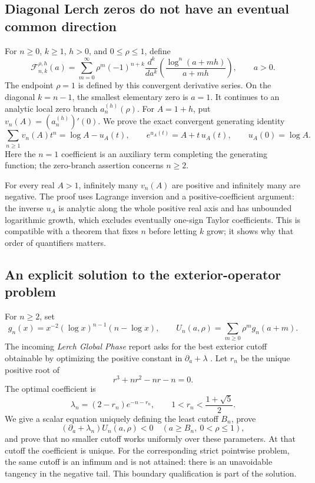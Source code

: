 \documentclass[11pt,a4paper]{article}
\theoremstyle{definition}
\theoremstyle{remark}
\numberwithin{equation}{section}
\begin{document}
\subsection{Diagonal Lerch zeros do not have an eventual common direction}

For $n\ge0$, $k\ge1$, $h>0$, and $0\le\rho\le1$, define
\[
 \mathscr F_{n,k}^{\rho,h}(a)=
 \sum_{m=0}^{\infty}\rho^m(-1)^{n+k}
 \frac{d^k}{da^k}\left(\frac{\log^n(a+mh)}{a+mh}\right),
 \qquad a>0.
\]
The endpoint $\rho=1$ is defined by this convergent derivative series.
On the diagonal $k=n-1$, the smallest elementary zero is $a=1$.
It continues to an analytic local zero branch $a_n^{(h)}(\rho)$.
For $A=1+h$, put $v_n(A)=(a_n^{(h)})'(0)$.
We prove the exact convergent generating identity
\[
 \sum_{n\ge1}v_n(A)t^n=\log A-u_A(t),\qquad
 e^{u_A(t)}=A+t\,u_A(t),\qquad u_A(0)=\log A.
\]
Here the $n=1$ coefficient is an auxiliary term completing the generating
function; the zero-branch assertion concerns $n\ge2$.

For every real $A>1$, infinitely many $v_n(A)$ are positive and infinitely
many are negative. The proof uses Lagrange inversion and a
positive-coefficient argument: the inverse $u_A$ is analytic along the
whole positive real axis and has unbounded logarithmic growth, which
excludes eventually one-sign Taylor coefficients. This is compatible
with a theorem that fixes $n$ before letting $k$ grow; it shows why that
order of quantifiers matters.

\subsection{An explicit solution to the exterior-operator problem}

For $n\ge2$, set
\[
 g_n(x)=x^{-2}(\log x)^{n-1}(n-\log x),\qquad
 U_n(a,\rho)=\sum_{m\ge0}\rho^m g_n(a+m).
\]
The incoming \emph{Lerch Global Phase} report asks for the best exterior
cutoff obtainable by optimizing the positive constant in
$\partial_a+\lambda$ \cite{IncomingPhase}. Let $r_n$ be the unique
positive root of
\[
 r^3+nr^2-nr-n=0.
\]
The optimal coefficient is
\[
 \lambda_n=(2-r_n)e^{-n-r_n},\qquad 1<r_n<\frac{1+\sqrt5}{2}.
\]
We give a scalar equation uniquely defining the least cutoff $B_n$,
prove
\[
 (\partial_a+\lambda_n)U_n(a,\rho)<0
 \quad(a\ge B_n,\ 0<\rho\le1),
\]
and prove that no smaller cutoff works uniformly over these parameters.
At that cutoff the coefficient is unique. For the corresponding strict
pointwise problem, the same cutoff is an infimum and is not attained:
there is an unavoidable tangency in the negative tail. This boundary
qualification is part of the solution.
\end{document}
